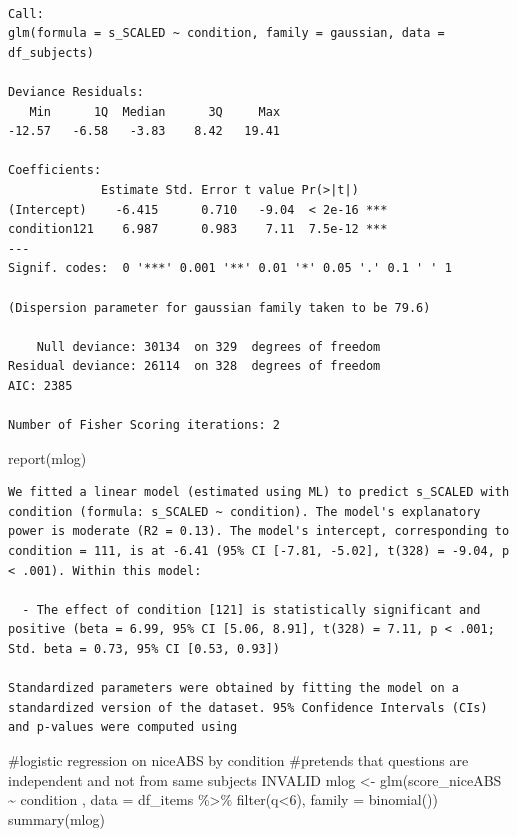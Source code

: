 \documentclass[
  letterpaper,
  DIV=11,
  numbers=noendperiod]{scrreprt}
\newenvironment{Shaded}{\begin{snugshade}}{\end{snugshade}}
\newcommand{\AttributeTok}[1]{\textcolor[rgb]{0.40,0.45,0.13}{#1}}
\newcommand{\CommentTok}[1]{\textcolor[rgb]{0.37,0.37,0.37}{#1}}
\newcommand{\DecValTok}[1]{\textcolor[rgb]{0.68,0.00,0.00}{#1}}
\newcommand{\FunctionTok}[1]{\textcolor[rgb]{0.28,0.35,0.67}{#1}}
\newcommand{\NormalTok}[1]{\textcolor[rgb]{0.00,0.23,0.31}{#1}}
\newcommand{\OtherTok}[1]{\textcolor[rgb]{0.00,0.23,0.31}{#1}}
\newcommand{\SpecialCharTok}[1]{\textcolor[rgb]{0.37,0.37,0.37}{#1}}
\begin{document}
\begin{verbatim}

Call:
glm(formula = s_SCALED ~ condition, family = gaussian, data = df_subjects)

Deviance Residuals: 
   Min      1Q  Median      3Q     Max  
-12.57   -6.58   -3.83    8.42   19.41  

Coefficients:
             Estimate Std. Error t value Pr(>|t|)    
(Intercept)    -6.415      0.710   -9.04  < 2e-16 ***
condition121    6.987      0.983    7.11  7.5e-12 ***
---
Signif. codes:  0 '***' 0.001 '**' 0.01 '*' 0.05 '.' 0.1 ' ' 1

(Dispersion parameter for gaussian family taken to be 79.6)

    Null deviance: 30134  on 329  degrees of freedom
Residual deviance: 26114  on 328  degrees of freedom
AIC: 2385

Number of Fisher Scoring iterations: 2
\end{verbatim}

\begin{Shaded}
\begin{Highlighting}[]
\FunctionTok{report}\NormalTok{(mlog)}
\end{Highlighting}
\end{Shaded}

\begin{verbatim}
We fitted a linear model (estimated using ML) to predict s_SCALED with condition (formula: s_SCALED ~ condition). The model's explanatory power is moderate (R2 = 0.13). The model's intercept, corresponding to condition = 111, is at -6.41 (95% CI [-7.81, -5.02], t(328) = -9.04, p < .001). Within this model:

  - The effect of condition [121] is statistically significant and positive (beta = 6.99, 95% CI [5.06, 8.91], t(328) = 7.11, p < .001; Std. beta = 0.73, 95% CI [0.53, 0.93])

Standardized parameters were obtained by fitting the model on a standardized version of the dataset. 95% Confidence Intervals (CIs) and p-values were computed using 
\end{verbatim}

\begin{Shaded}
\begin{Highlighting}[]
\CommentTok{\#logistic regression on niceABS by condition}
\CommentTok{\#pretends that questions are independent and not from same subjects INVALID}
\NormalTok{mlog }\OtherTok{\textless{}{-}} \FunctionTok{glm}\NormalTok{(score\_niceABS }\SpecialCharTok{\textasciitilde{}}\NormalTok{ condition , }\AttributeTok{data =}\NormalTok{ df\_items }\SpecialCharTok{\%\textgreater{}\%} \FunctionTok{filter}\NormalTok{(q}\SpecialCharTok{\textless{}}\DecValTok{6}\NormalTok{), }\AttributeTok{family =} \FunctionTok{binomial}\NormalTok{())}
\FunctionTok{summary}\NormalTok{(mlog)}
\end{Highlighting}
\end{Shaded}
\end{document}
